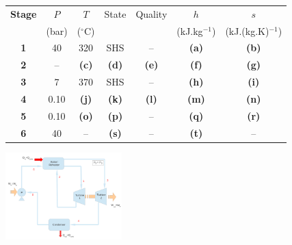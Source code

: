 \documentclass[10pt,compress,handout,ignorenonframetext]{beamer}
\begin{document}
\begin{frame}
       \begin{center}
         \begin{tabular}{c | c c c c c c  }
           \hline\scriptsize
           {\bf Stage} & $P$    & $T$             &  State       & Quality     & $h$                 & $s$                      \\
                       & (bar)  & ($^{\circ}$C)    &              &             & (kJ.kg$^{-1}$)       & (kJ.(kg.K)$^{-1}$)        \\
           \hline
            {\bf 1 }   & 40         & 320         & SHS          & --          & {\bf (a)}           & {\bf (b)}                 \\
            {\bf 2 }   &  --        & {\bf (c)}   & {\bf (d)}    & {\bf (e)}   & {\bf (f)}           & {\bf (g)}          \\
            {\bf 3 }   & 7          & 370         & SHS          & --          & {\bf (h)}           & {\bf (i)}                 \\
            {\bf 4 }   & 0.10       & {\bf (j)}   & {\bf (k)}    & {\bf (l)}   & {\bf (m)}           & {\bf (n)}                     \\
            {\bf 5 }   & 0.10       & {\bf (o)}   & {\bf (p)}    & --          & {\bf (q)}           & {\bf (r)}    \\
            {\bf 6 }   & 40         & --          & {\bf (s)}    & --          & {\bf (t)}           & --                      \\
           \hline
         \end{tabular}
        \end{center}
         \begin{center}
            \includegraphics[width=4.5cm,clip]{./Pics/Exam_Reheat_Rankine_Cycle}
         \end{center}

\end{frame} 
\end{document}
